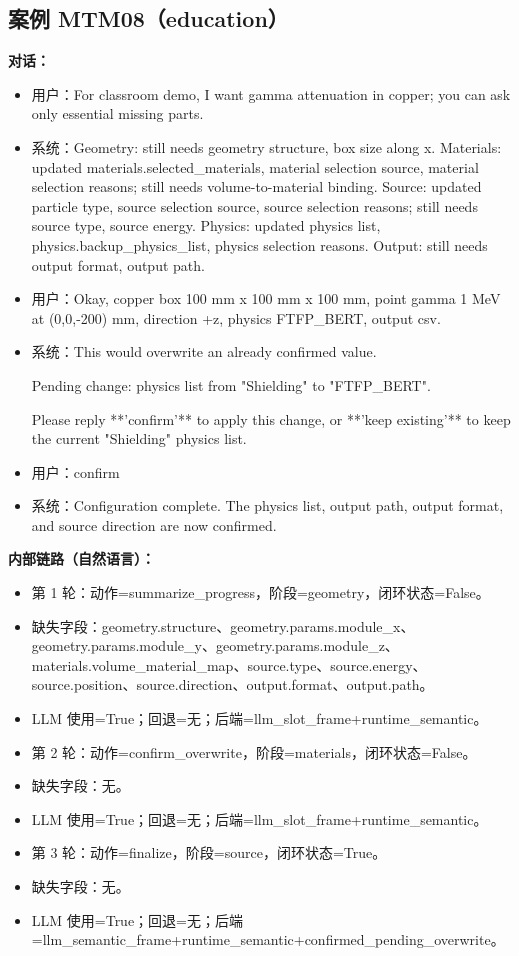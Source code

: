 \documentclass[11pt]{ctexart}
\begin{document}
\subsection{案例 MTM08（education）}
\textbf{对话：}
\begin{itemize}
\item 用户：For classroom demo, I want gamma attenuation in copper; you can ask only essential missing parts.
\item 系统：Geometry: still needs geometry structure, box size along x. Materials: updated materials.selected\_materials, material selection source, material selection reasons; still needs volume-to-material binding. Source: updated particle type, source selection source, source selection reasons; still needs source type, source energy. Physics: updated physics list, physics.backup\_physics\_list, physics selection reasons. Output: still needs output format, output path.
\item 用户：Okay, copper box 100 mm x 100 mm x 100 mm, point gamma 1 MeV at (0,0,-200) mm, direction +z, physics FTFP\_BERT, output csv.
\item 系统：This would overwrite an already confirmed value.

Pending change: physics list from "Shielding" to "FTFP\_BERT".

Please reply **'confirm'** to apply this change, or **'keep existing'** to keep the current "Shielding" physics list.
\item 用户：confirm
\item 系统：Configuration complete. The physics list, output path, output format, and source direction are now confirmed.
\end{itemize}
\textbf{内部链路（自然语言）：}
\begin{itemize}
\item 第 1 轮：动作=summarize\_progress，阶段=geometry，闭环状态=False。
\item 缺失字段：geometry.structure、geometry.params.module\_x、geometry.params.module\_y、geometry.params.module\_z、materials.volume\_material\_map、source.type、source.energy、source.position、source.direction、output.format、output.path。
\item LLM 使用=True；回退=无；后端=llm\_slot\_frame+runtime\_semantic。
\item 第 2 轮：动作=confirm\_overwrite，阶段=materials，闭环状态=False。
\item 缺失字段：无。
\item LLM 使用=True；回退=无；后端=llm\_slot\_frame+runtime\_semantic。
\item 第 3 轮：动作=finalize，阶段=source，闭环状态=True。
\item 缺失字段：无。
\item LLM 使用=True；回退=无；后端=llm\_semantic\_frame+runtime\_semantic+confirmed\_pending\_overwrite。
\end{itemize}
\end{document}

